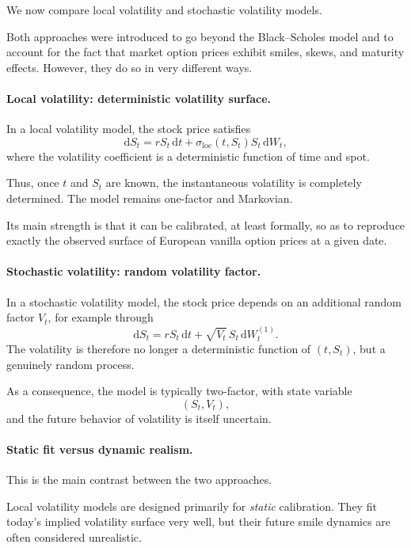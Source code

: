 \documentclass[11pt]{article}
\theoremstyle{plain}
\theoremstyle{definition}
\theoremstyle{remark}
\begin{document}
We now compare local volatility and stochastic volatility models.

Both approaches were introduced to go beyond the Black--Scholes model
and to account for the fact that market option prices exhibit smiles,
skews, and maturity effects.
However, they do so in very different ways.

\paragraph{Local volatility: deterministic volatility surface.}

In a local volatility model, the stock price satisfies
\[
\mathrm{d}S_t
=
rS_t\,\mathrm{d}t
+
\sigma_{\mathrm{loc}}(t,S_t)S_t\,\mathrm{d}W_t,
\]
where the volatility coefficient is a deterministic function of time and
spot.

Thus, once \(t\) and \(S_t\) are known, the instantaneous volatility is
completely determined.
The model remains one-factor and Markovian.

Its main strength is that it can be calibrated, at least formally, so as
to reproduce exactly the observed surface of European vanilla option
prices at a given date.

\paragraph{Stochastic volatility: random volatility factor.}

In a stochastic volatility model, the stock price depends on an
additional random factor \(V_t\), for example through
\[
\mathrm{d}S_t
=
rS_t\,\mathrm{d}t
+
\sqrt{V_t}\,S_t\,\mathrm{d}W_t^{(1)}.
\]
The volatility is therefore no longer a deterministic function of
\((t,S_t)\), but a genuinely random process.

As a consequence, the model is typically two-factor, with state variable
\[
(S_t,V_t),
\]
and the future behavior of volatility is itself uncertain.

\paragraph{Static fit versus dynamic realism.}

This is the main contrast between the two approaches.

Local volatility models are designed primarily for \emph{static}
calibration.
They fit today's implied volatility surface very well, but their future
smile dynamics are often considered unrealistic.
\end{document}
